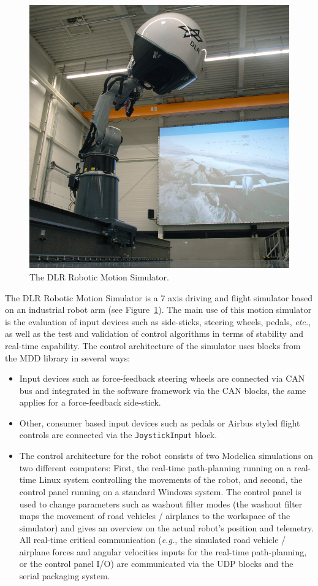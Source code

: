 \documentclass{resources/modelica}
\newcommand{\modelica}[1]{\lstinline[language=modelica]|#1|}
\begin{document}
\begin{figure}[htb]
  \centering
  \includegraphics[width=0.9\columnwidth]{figures/DLRRoboticMotionSimulator}
  \caption{The DLR Robotic Motion Simulator.}
  \label{fig:DLRRoboticMotionSimulator}
\end{figure}

The DLR Robotic Motion Simulator \citep{bellmann2011dlr} is a 7 axis driving and
flight simulator based on an industrial robot arm (see
Figure~\ref{fig:DLRRoboticMotionSimulator}). The main use of this motion
simulator is the evaluation of input devices such as side-sticks, steering
wheels, pedals, \textit{etc.}, as well as the test and validation of control algorithms
in terms of stability and real-time capability. The control architecture of the
simulator uses blocks from the MDD library in several ways:
\begin{itemize}
  \item Input devices such as force-feedback steering wheels are connected via CAN bus
and integrated in the software framework via the CAN blocks, the same
applies for a force-feedback side-stick.
  \item Other, consumer based input devices such as pedals or Airbus styled flight
controls are connected via the \modelica{JoystickInput} block.
  \item The control architecture for the robot consists of two Modelica simulations on
two different computers: First, the real-time path-planning running on a
real-time Linux system controlling the movements of the robot, and second, the
control panel running on a standard Windows system. The control panel is used to
change parameters such as washout filter modes (the washout filter maps the
movement of road vehicles / airplanes to the workspace of the simulator) and
gives an overview on the actual robot's position and telemetry. All real-time critical
communication (\textit{e.g.}, the simulated road vehicle / airplane forces and
angular velocities inputs for the real-time path-planning, or the control panel
I/O) are communicated via the UDP blocks and the serial
packaging system.
\end{itemize}
\end{document}
